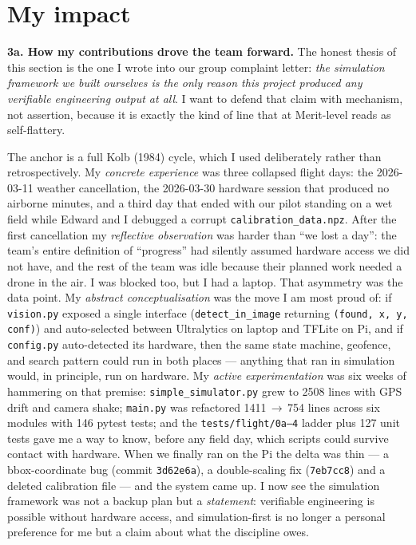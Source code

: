 \section{My impact}

\textbf{3a. How my contributions drove the team forward.} The honest thesis of this section is the one I wrote into our group complaint letter: \emph{the simulation framework we built ourselves is the only reason this project produced any verifiable engineering output at all}. I want to defend that claim with mechanism, not assertion, because it is exactly the kind of line that at Merit-level reads as self-flattery.

The anchor is a full Kolb (1984) cycle, which I used deliberately rather than retrospectively. My \emph{concrete experience} was three collapsed flight days: the 2026-03-11 weather cancellation, the 2026-03-30 hardware session that produced no airborne minutes, and a third day that ended with our pilot standing on a wet field while Edward and I debugged a corrupt \texttt{calibration\_data.npz}. After the first cancellation my \emph{reflective observation} was harder than ``we lost a day'': the team's entire definition of ``progress'' had silently assumed hardware access we did not have, and the rest of the team was idle because their planned work needed a drone in the air. I was blocked too, but I had a laptop. That asymmetry was the data point. My \emph{abstract conceptualisation} was the move I am most proud of: if \texttt{vision.py} exposed a single interface (\texttt{detect\_in\_image} returning \texttt{(found, x, y, conf)}) and auto-selected between Ultralytics on laptop and TFLite on Pi, and if \texttt{config.py} auto-detected its hardware, then the same state machine, geofence, and search pattern could run in both places --- anything that ran in simulation would, in principle, run on hardware. My \emph{active experimentation} was six weeks of hammering on that premise: \texttt{simple\_simulator.py} grew to 2508 lines with GPS drift and camera shake; \texttt{main.py} was refactored 1411\,$\to$\,754 lines across six modules with 146 pytest tests; and the \texttt{tests/flight/0a--4} ladder plus 127 unit tests gave me a way to know, before any field day, which scripts could survive contact with hardware. When we finally ran on the Pi the delta was thin --- a bbox-coordinate bug (commit \texttt{3d62e6a}), a double-scaling fix (\texttt{7eb7cc8}) and a deleted calibration file --- and the system came up. I now see the simulation framework was not a backup plan but a \emph{statement}: verifiable engineering is possible without hardware access, and simulation-first is no longer a personal preference for me but a claim about what the discipline owes.

